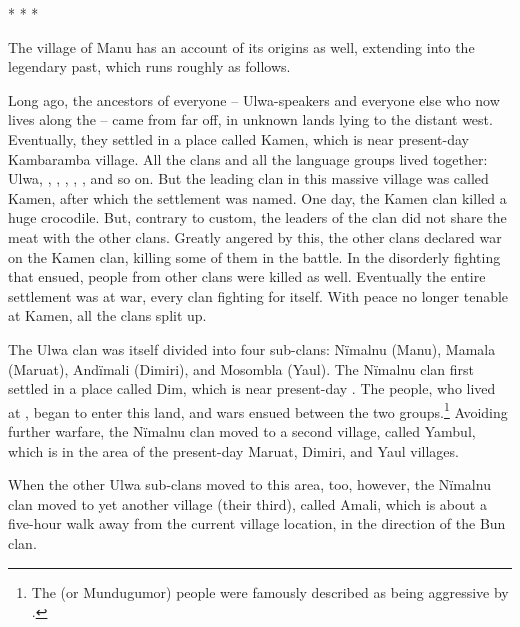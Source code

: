   \bigskip
  \noindent
  * * *

  \bigskip
  \noindent
The village of Manu has an account of its origins as well, extending into the legendary past, which runs roughly as follows.

  Long ago, the ancestors of everyone -- Ulwa-speakers and everyone else who now lives along the  -- came from far off, in unknown lands lying to the distant west. Eventually, they settled in a place called Kamen, which is near present-day Kambaramba village. All the clans and all the language groups lived together: Ulwa, , , , , , and so on. But the leading clan in this massive village was called Kamen, after which the settlement was named. One day, the Kamen clan killed a huge crocodile. But, contrary to custom, the leaders of the clan did not share the meat with the other clans. Greatly angered by this, the other clans declared war on the Kamen clan, killing some of them in the battle. In the disorderly fighting that ensued, people from other clans were killed as well. Eventually the entire settlement was at war, every clan fighting for itself. With peace no longer tenable at Kamen, all the clans split up.

  The Ulwa clan was itself divided into four sub-clans: Nïmalnu (Manu), Mamala (Maruat), Andïmali (Dimiri), and Mosombla (Yaul). The Nïmalnu clan first settled in a place called Dim, which is near present-day . The  people, who lived at , began to enter this land, and wars ensued between the two groups.\footnote{The  (or Mundugumor) people were famously described as being aggressive by \citet{Mead1935}.} Avoiding further warfare, the Nïmalnu clan moved to a second village, called Yambul, which is in the area of the present-day Maruat, Dimiri, and Yaul villages.

  When the other Ulwa sub-clans moved to this area, too, however, the Nïmalnu clan moved to yet another village (their third), called Amali, which is about a five-hour walk away from the current village location, in the direction of the Bun clan.


